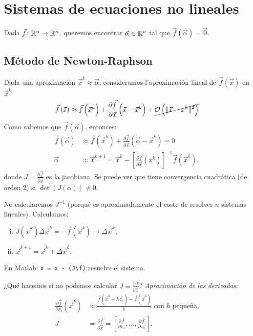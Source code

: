 \chapter{Sistemas de ecuaciones no lineales}

\noindent Dada $\vec{f} \colon \mathbb{R}^n \to \mathbb{R}^n$, queremos encontrar $\vec{\alpha} \in \mathbb{R}^n$ tal que $\vec{f}\left( \vec{\alpha} \right) = \vec{0}$.

\section{M\'etodo de Newton-Raphson}

\noindent Dada una aproximaci\'on $\vec{x}^k \approx \vec{\alpha}$, consideramos l'aproximaci\'on lineal de $\vec{f}\left( \vec{x} \right)$ en $\vec{x}^k$
\[
    \vec{f}\left( \vec{x} \right) \approx \vec{f}\left( \vec{x}^k \right) + \frac{\partial \vec{f}}{\partial \vec{x}}\left( \vec{x}-\vec{x}^k \right) + \cancel{\mathcal{O} \left( \| \vec{x}-x^k\|^2 \right)}
\]
Como sabemos que $\vec{f} \left( \vec{\alpha} \right)$, entonces:
\begin{align*}
    \vec{f}\left( \vec{\alpha} \right) &\approx \vec{f}\left( \vec{x}^k \right) + \frac{\partial \vec{f}}{\partial \vec{x}}\left( \vec{\alpha}-\vec{x}^k \right) = 0\\
    \vec{\alpha} &\approx \vec{x}^{k+1} = \vec{x}^k - \left[ \frac{\partial\vec{f}}{\partial\vec{x}}\left( x^k \right) \right]^{-1} \vec{f}\left( \vec{x}^k \right),
\end{align*}
donde $J = \frac{\partial\vec{f}}{\partial \vec{x}}$ es la jacobiana. Se puede ver que tiene convergencia cuadr\'atica (de orden 2) si $\det\left( J(\alpha) \right) \neq 0$.

\begin{obs}
    No calcularemos $J^{-1}$ (porqu\'e es aproximadamente el coste de resolver $n$ sistemas lineales). Calculamos:
    \begin{enumerate}[i)]
        \item $J\left( \vec{x}^k \right)\Delta \vec{x}^k = -\vec{f}\left( \vec{x}^k \right) \longrightarrow \Delta \vec{x}^k$,
        \item $\vec{x}^{k+1} = \vec{x}^k + \Delta\vec{x}^k$.
    \end{enumerate}
    En Matlab: \texttt{x = x - (J\textbackslash f)} resuelve el sistema.
\end{obs}

\noindent ¿Qu\'e hacemos si no podemos calcular $J = \frac{\partial \vec{f}}{\partial \vec{x}}$?
\emph{Aproximaci\'on de las derivadas}:
\begin{align*}
    \frac{\partial \vec{f}}{\partial x_i}\left( \vec{x}^k \right) &\approx \frac{\vec{f}\left( \vec{x}^k + h\vec{e}_i \right) - \vec{f}\left( \vec{x}^k \right)}{h} \text{ con } h \text{ pequeña,} \\
    J &= \frac{\partial \vec{f}}{\partial \vec{x}} = \left[ \frac{\partial \vec{f}}{\partial x_1}, \dots, \frac{\partial \vec{f}}{\partial x_n} \right].
\end{align*}

